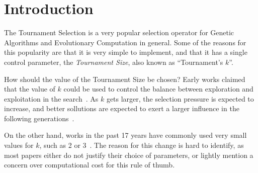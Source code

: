 \section{Introduction}\label{intro}


The Tournament Selection is a very popular selection operator for
Genetic Algorithms and Evolutionary Computation in general. Some of
the reasons for this popularity are that it is very simple to
implement, and that it has a single control parameter, the
\emph{Tournament Size}, also known as ``Tournament's $k$''.

How should the value of the Tournament Size be chosen? Early works
claimed that the value of $k$ could be used to control the balance
between exploration and exploitation in the
search~\cite{blickle1995mathematical}. As $k$ gets larger, the
selection pressure is expected to increase, and better sollutions are
expected to exert a larger influence in the following
generations~\cite{miller1995genetic}.

On the other hand, works in the past 17 years have commonly used very
small values for $k$, such as 2 or
3~\cite{deb2000efficient,beyer2001self,
  kaelo2007integrated,nicolau2009application,
  sawyerr2011comparative,sawyerr2015benchmarking, oztekin2018decision}. The reason for this
change is hard to identify, as most papers either do not justify their
choice of parameters, or lightly mention a concern over computational
cost for this rule of thumb.


